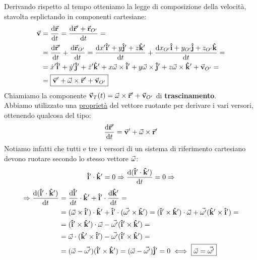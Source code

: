 \documentclass{report}
\newcommand{\note}{\noindent {\quad \bf \underline{Osservazione:}} \quad}
\newcommand{\then}{\ensuremath{\Rightarrow}}
\renewcommand{\i}{\vu{i}}
\renewcommand{\j}{\vu{j}}
\renewcommand{\k}{\vu{k}}
\renewcommand{\v}{\va{v}}
\renewcommand{\r}{\va{r}}
\begin{document}
Derivando rispetto al tempo otteniamo la legge di composizione della velocità, stavolta esplictando in componenti cartesiane:
\begin{equation}
\begin{split}
    \v&=\dv{\r}{t}=\dv{\r'+\r_{O'}}{t}=\\
    &=\dv{\r'}{t}+\dv{\r_{O'}}{t}=\dv{x'\i'+y\j'+z\k'}{t}+\dv{x_{O'}\i+y_{O'}\j+z_{O'}\k}{t}=\\
    &=\Dot{x}'\i'+\Dot{y}'\j'+\Dot{z}'\k'+x\va{\omega}\times\i'+y\va{\omega}\times\j'+z\va{\omega}\times\k'+\v_{O'}=\\
    &=\boxed{\v'+\va{\omega}\times\r'+\v_{O'}}
\end{split}
\end{equation}
Chiamiamo la componente $\v_T(t)=\va{\omega}\times\r'+\v_{O'}$ di \textbf{trascinamento}.\\
\note Abbiamo utilizzato una \hyperlink{vettoreruotante}{proprietà} del vettore ruotante per derivare i vari versori, ottenendo qualcosa del tipo:
\[\dv{\r'}{t}=\v'+\va{\omega}\times\r'\]
Notiamo infatti che tutti e tre i versori di un sistema di riferimento cartesiano devono ruotare secondo lo stesso vettore $\va{\omega}$:
\[\i'\cdot\k'=0\then \dv{(\i'\cdot\k')}{t}=0\then\]
\begin{equation}
\begin{split}
    \then \dv{(\i'\cdot\k')}{t}&=\dv{\i'}{t}\cdot\k'+\i'\cdot\dv{\k'}{t}=\\
    &=(\va{\omega}\times\i')\cdot\k'+\i'\cdot(\va{\omega'}\times\k')=(\i'\times\k')\cdot\va{\omega}+\va{\omega'}(\k'\times\i')=\\
    &=(\i'\times\k')\cdot\va{\omega}-\va{\omega'}(\i'\times\k')=\\
    &=\va{\omega}\cdot(\k'\times\i')-\va{\omega'}(\i'\times\k')=\\
    &=(\va{\omega}-\va{\omega'})(\i'\times\k')=(\va{\omega}-\va{\omega'})\j'=0\iff \boxed{\va{\omega}=\va{\omega'}}    
\end{split}
\end{equation} 
\end{document}
